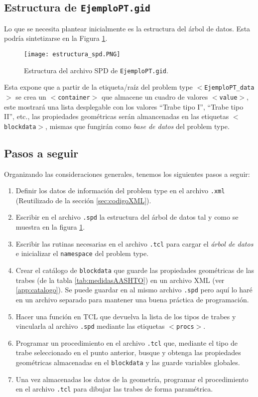 \documentclass[10pt, a4paper, twocolumn]{article} %
\begin{document}
\subsection{Estructura de \texttt{EjemploPT.gid}}
Lo que se necesita plantear inicialmente es la estructura del árbol de datos. Esta podría sintetizarse en la Figura \ref{fig:estructura_spd}.

\begin{figure}[hbt!]\label{fig:estructura_spd}
	\centering
	\texttt{[image: estructura\_spd.PNG]}
	\caption{Estructura del archivo SPD de \texttt{EjemploPT.gid}.}
\end{figure}

Esta expone que a partir de la etiqueta/raíz del problem type \texttt{$<$EjemploPT\_data$>$} se crea un \texttt{$<$container$>$} que almacene un cuadro de valores \texttt{$<$value$>$}, este mostrará una lista desplegable con los valores ``Trabe tipo I'', ``Trabe tipo II'', etc., las propiedades geométricas serán almancenadas en las etiquetas \texttt{$<$blockdata$>$}, mismas que fungirán como \textit{base de datos} del problem type.

\subsection{Pasos a seguir}

Organizando las consideraciones generales, tenemos los siguientes pasos a seguir:

\begin{enumerate}
	\item Definir los datos de información del problem type en el archivo \texttt{.xml} (Reutilizado de la sección \ref{sec:codigoXML}).
	\item Escribir en el archivo \texttt{.spd} la estructura del árbol de datos tal y como se muestra en la figura \ref{fig:estructura_spd}.
	\item Escribir las rutinas necesarias en el archivo \texttt{.tcl} para cargar el \textit{árbol de datos} e inicializar el \texttt{namespace} del problem type.
	\item Crear el catálogo de \texttt{blockdata} que guarde las propiedades geométricas de las trabes (de la tabla \ref{tab:medidasAASHTO}) en un archivo XML (ver \ref{app:catalogo}). Se puede guardar en al mismo archivo \texttt{.spd} pero aquí lo haré en un archivo separado para mantener una buena práctica de programación.
	\item Hacer una función en TCL que devuelva la lista de los tipos de trabes y vincularla al archivo \texttt{.spd} mediante las etiquetas \texttt{$<$procs$>$}.
	\item Programar un procedimiento en el archivo \texttt{.tcl} que, mediante el tipo de trabe seleccionado en el punto anterior, busque y obtenga las propiedades geométricas almacenadas en el \texttt{blockdata} y las guarde variables globales.
	\item Una vez almacenadas los datos de la geometría, programar el procedimiento en el archivo \texttt{.tcl} para dibujar las trabes de forma paramétrica.
\end{enumerate}
\end{document}
